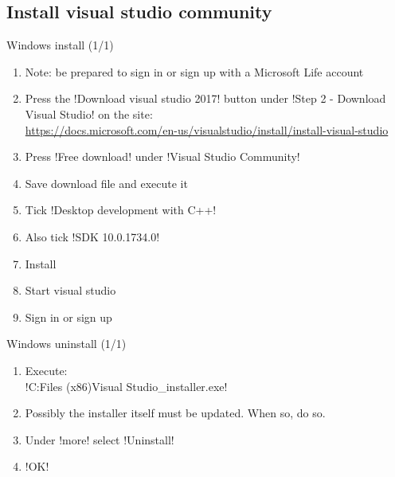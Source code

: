 \subsection{Install visual studio community}

\begin{frame}[fragile]{Windows install (1/1)}
\begin{enumerate}
\item Note: be prepared to sign in or sign up with a Microsoft Life account
\item Press the !Download visual studio 2017! button under !Step 2 - Download Visual Studio!
      on the site:\\
      \url{https://docs.microsoft.com/en-us/visualstudio/install/install-visual-studio}
\item Press !Free download! under !Visual Studio Community!
\item Save download file and execute it
\item Tick !Desktop development with C++!
\item Also tick !SDK 10.0.1734.0!
\item Install
\item Start visual studio
\item Sign in or sign up
\end{enumerate}
\end{frame}

\begin{frame}[fragile]{Windows uninstall (1/1)}
\begin{enumerate}
\item Execute:\\
      !C:\Program Files (x86)\Microsoft Visual Studio\Installer\vs_installer.exe!
\item Possibly the installer itself must be updated. When so, do so.
\item Under !more! select !Uninstall!
\item !OK!
\end{enumerate}
\end{frame}
